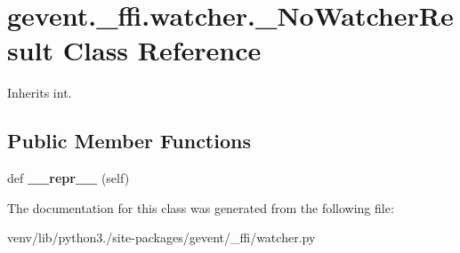 \hypertarget{classgevent_1_1__ffi_1_1watcher_1_1___no_watcher_result}{}\section{gevent.\+\_\+ffi.\+watcher.\+\_\+\+No\+Watcher\+Result Class Reference}
\label{classgevent_1_1__ffi_1_1watcher_1_1___no_watcher_result}


Inherits int.

\subsection*{Public Member Functions}
\begin{DoxyCompactItemize}
\item 
\mbox{\label{classgevent_1_1__ffi_1_1watcher_1_1___no_watcher_result_ada44517884b7b8c4c9d19833bbf0d837}} 
def {\bfseries \+\_\+\+\_\+repr\+\_\+\+\_\+} (self)
\end{DoxyCompactItemize}


The documentation for this class was generated from the following file\+:\begin{DoxyCompactItemize}
\item 
venv/lib/python3./site-\/packages/gevent/\+\_\+ffi/watcher.\+py\end{DoxyCompactItemize}

